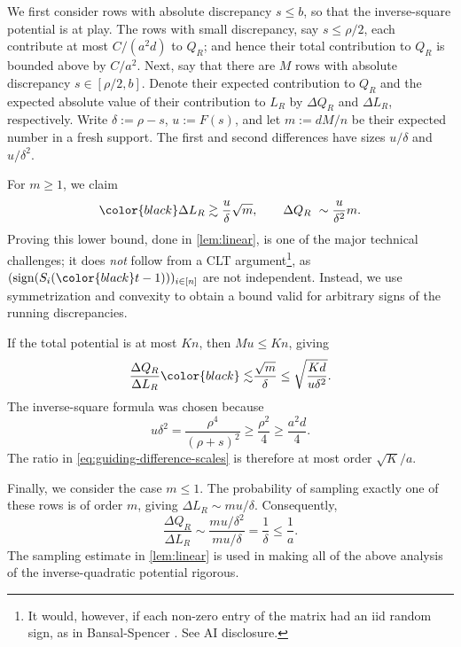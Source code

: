 \documentclass[reqno,english]{amsart}
\theoremstyle{definition}
\begin{document}
We first consider rows with absolute discrepancy $s \le b$, so that the inverse-square potential is at play. The rows with small discrepancy, say $s \le \rho/2$, {\color{black}each} contribute at most $C/(a^2d)$ to $Q_R$; and hence their total contribution to {\color{black}$Q_R$} is bounded above by $C/a^2$. Next, say that there are $M$ rows with absolute discrepancy $s \in [\rho/2, b]$. {\color{black}Denote their expected contribution to $Q_R$ and the expected absolute value of their contribution to $L_R$ by $\Delta Q_R$ and $\Delta L_R$, respectively.} Write $\delta:=\rho-s$, $u:=F(s)$, and let $m:=dM/n$
be their expected number in a fresh support.
The first and second differences have sizes $u/\delta$ and $u/\delta^2$.


For $m\ge1$, we claim
\[
 {\color{black}\Delta L_R \gtrsim\frac{u}{\delta}\sqrt m},
 \qquad
 \Delta Q_R\ \sim\frac{u}{\delta^2}m.
\]
Proving {\color{black}this lower bound}, done in \cref{lem:linear}, is one of the major technical challenges; {\color{black}it does} \textit{not} follow from a CLT argument\footnote{It would, however, if each non-zero entry of the matrix had an iid random sign, as in Bansal-Spencer \cite{bansal-spencer}. See AI disclosure.}, as $(\mathrm{sign}(S_i({\color{black}t-1})))_{i \in [n]}$ are not independent. Instead, we use symmetrization and convexity {\color{black}to obtain a bound valid for arbitrary signs of the running discrepancies}.  

If the total potential is at most $Kn$, then $Mu\le Kn$, giving
\begin{equation}\label{eq:guiding-difference-scales}
 \frac{\Delta Q_R}{\Delta L_R}
 {\color{black}\lesssim}\frac{\sqrt m}{\delta}
 \le\sqrt{\frac{Kd}{u\delta^2}}.
\end{equation}
The inverse-square formula was chosen because
\begin{equation}\label{eq:guiding-choice}
 u\delta^2=\frac{\rho^4}{(\rho+s)^2}
 \ge\frac{\rho^2}{4}\ge\frac{a^2d}{4}.
\end{equation}
The ratio in \eqref{eq:guiding-difference-scales} is therefore at most order $\sqrt K/a$. 

Finally, we consider the case $m\le1$. The probability of sampling exactly one of these rows
is of order $m$, giving $\Delta L_R \sim mu/\delta$.
Consequently,
\[
    \frac{\Delta Q_R}{\Delta L_R}
 \sim\frac{mu/\delta^2}{mu/\delta}=\frac1\delta \le \frac{1}{a}.
\]
The sampling estimate in \cref{lem:linear} is used in making all of the above analysis of the inverse-quadratic potential rigorous.
\end{document}
